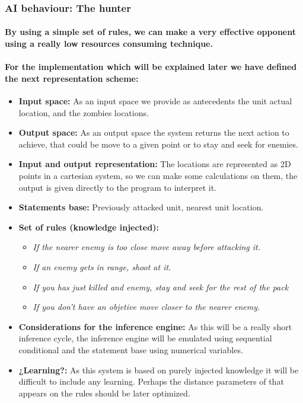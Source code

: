 \documentclass[a4paper,10pt]{article}
\newcommand{\p}[1]{\paragraph{\indent\textnormal{#1}}}
\begin{document}
    \subsubsection{AI behaviour: The hunter}

      \p{By using a simple set of rules, we can make a very effective opponent using a really low resources consuming technique.}

      \p{For the implementation which will be explained later we have defined the next representation scheme:}

      \begin{itemize}
      \item \textbf{Input space:} As an input space we provide as antecedents the unit actual location, and the zombies locations.
      \item \textbf{Output space:} As an output space the system returns the next action to achieve, that could be move to a given point or to stay and seek for enemies.
      \item \textbf{Input and output representation:} The locations are represented as 2D points in a cartesian system, so we can make some calculations on them, the output is given directly to the program to interpret it.
      \item \textbf{Statements base:} Previously attacked unit, nearest unit location.
      \item \textbf{Set of rules (knowledge injected):}
	  \begin{itemize}
	    \item \textit{If the nearer enemy is too close move away before attacking it.}
	    \item \textit{If an enemy gets in range, shoot at it.}
	    \item \textit{If you has just killed and enemy, stay and seek for the rest of the pack}
	    \item \textit{If you don't have an objetive move closer to the nearer enemy.}

	  \end{itemize}
      \item \textbf{Considerations for the inference engine:} As this will be a really short inference cycle, the inference engine will be emulated using sequential conditional and the statement base using numerical variables.
      \item \textbf{¿Learning?:} As this system is based on purely injected knowledge it will be difficult to include any learning. Perhaps the distance parameters of that appears on the rules should be later optimized.
      \end{itemize}
\end{document}
